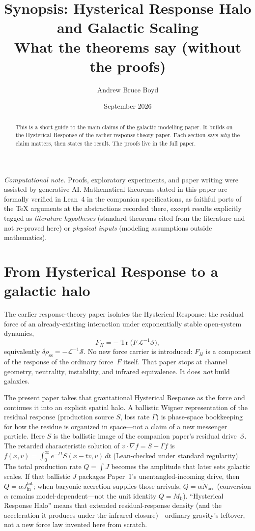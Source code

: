 \documentclass[11pt]{article}
\title{\textbf{Synopsis: Hysterical Response Halo and Galactic Scaling}\\[0.35em]
\large What the theorems say (without the proofs)}
\author{Andrew Bruce Boyd}
\date{September 2026}
\theoremstyle{definition}
\theoremstyle{remark}
\newcommand{\Mb}{M_{\mathrm{b}}}
\newcommand{\FH}{F_H}
\newcommand{\Tr}{\operatorname{Tr}}
\begin{document}
\maketitle
\noindent\textit{Computational note.}
Proofs, exploratory experiments, and paper writing were assisted by generative AI.
Mathematical theorems stated in this paper are formally verified in Lean~4 in the
companion specifications, as faithful ports of the TeX arguments at the abstractions
recorded there, except results explicitly tagged as \emph{literature hypotheses}
(standard theorems cited from the literature and not re-proved here) or
\emph{physical inputs} (modeling assumptions outside mathematics).

\begin{abstract}
This is a short guide to the main claims of the galactic modelling paper.
It builds on the Hysterical Response of the earlier response-theory paper.
Each section says \emph{why} the claim matters, then states the result.
The proofs live in the full paper.
\end{abstract}

\section{From Hysterical Response to a galactic halo}
The earlier response-theory paper isolates the Hysterical Response: the residual force of an already-existing interaction under exponentially stable open-system dynamics,
\begin{equation}
  \FH=-\Tr\!\bigl(F\,\mathcal L^{-1}\mathcal S\bigr),
\end{equation}
equivalently $\delta\rho_{\mathrm{ss}}=-\mathcal L^{-1}\mathcal S$.
No new force carrier is introduced: $\FH$ is a component of the response of the ordinary force~$F$ itself.
That paper stops at channel geometry, neutrality, instability, and infrared equivalence.
It does \emph{not} build galaxies.

The present paper takes that gravitational Hysterical Response as the force and continues it into an explicit spatial halo.
A ballistic Wigner representation of the residual response (production source $S$, loss rate $\Gamma$) is phase-space bookkeeping for how the residue is organized in space---not a claim of a new messenger particle.
Here $S$ is the ballistic image of the companion paper's residual drive~$\mathcal S$.
The retarded characteristic solution of $v\cdot\nabla f=S-\Gamma f$ is
$f(x,v)=\int_0^\infty e^{-\Gamma t}S(x-tv,v)\,dt$ (Lean-checked under standard regularity).
The total production rate $Q=\int J$ becomes the amplitude that later sets galactic scales.
If that ballistic $J$ packages Paper~1's unentangled-incoming drive, then $Q=\alpha J_{\mathrm{in}}^{\mathrm{tot}}$; when baryonic accretion supplies those arrivals, $Q=\alpha\dot N_{\mathrm{acc}}$ (conversion $\alpha$ remains model-dependent---not the unit identity $Q=\dot\Mb$).
``Hysterical Response Halo'' means that extended residual-response density (and the acceleration it produces under the infrared closure)---ordinary gravity's leftover, not a new force law invented here from scratch.
\end{document}
